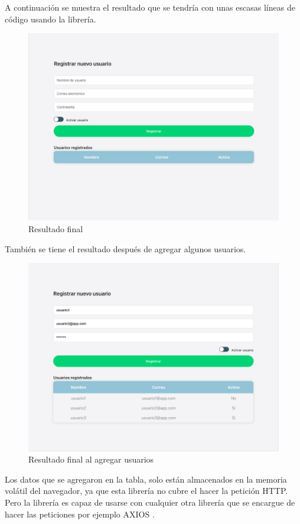 A continuación se muestra el resultado que se tendría con unas escasas líneas de código usando la librería.
\newline
\begin{figure}[H]
    \includegraphics[width=1\textwidth]{./Imagenes/9.10}
   \centering 
    \caption[Resultado final]{Resultado final}
    \end{figure}
\newline
También se tiene el resultado después de agregar algunos usuarios.
\newline
\begin{figure}[H]
    \includegraphics[width=1\textwidth]{./Imagenes/9.11}
   \centering 
    \caption[Resultado final al agregar usuarios]{Resultado final al agregar usuarios}
    \end{figure}
\newline
Los datos que se agregaron en la tabla, solo están almacenados en la memoria volátil del navegador, ya que esta librería no cubre el hacer la petición HTTP. Pero la librería es capaz de usarse con cualquier otra librería que se encargue de hacer las peticiones por ejemplo AXIOS \cite{axios}.

